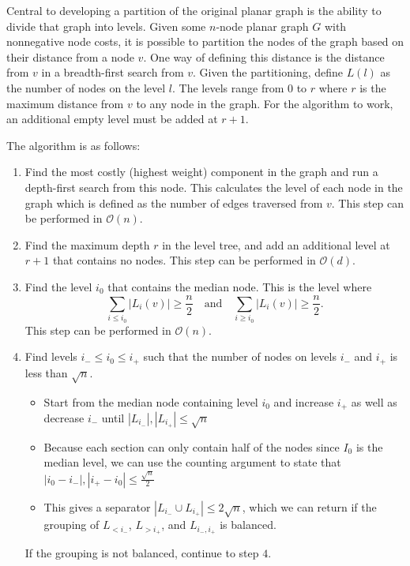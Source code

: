 \documentclass[11pt]{article}
\begin{document}
Central to developing a partition of the original planar graph is the ability to divide that graph into levels. Given some $n$-node planar graph $G$ with nonnegative node costs, it is possible to partition the nodes of the graph based on their distance from a node $v$. One way of defining this distance is the distance from $v$ in a breadth-first search from $v$. Given the partitioning, define $L(l)$ as the number of nodes on the level $l$. The levels range from $0$ to $r$ where $r$ is the maximum distance from $v$ to any node in the graph. For the algorithm to work, an additional empty level must be added at $r+1$.

The algorithm is as follows:
\begin{enumerate}

    \item Find the most costly (highest weight) component in the graph and run a depth-first search from this node. This calculates the level of each node in the graph which is defined as the number of edges traversed from $v$. This step can be performed in $\mathcal{O}(n)$.

    \item Find the maximum depth $r$ in the level tree, and add an additional level at $r+1$ that contains no nodes. This step can be performed in $\mathcal{O}(d)$.

    \item Find the level $i_0$ that contains the median node. This is the level where
    \[
    \sum_{i \leq i_0} |L_i(v)| \geq \frac{n}{2} \quad \text{and}\quad \sum_{i \geq i_0} |L_i(v)| \geq \frac{n}{2}.
    \]
    This step can be performed in $\mathcal{O}(n)$.

    \item Find levels $i_- \leq i_0 \leq i_+$ such that the number of nodes on levels $i_-$ and $i_+$ is less than $\sqrt{n}$.
    \begin{itemize}
        \item Start from the median node containing level $i_0$ and increase $i_+$ as well as decrease $i_-$ until $|L_{i_-}|,|L_{i_+}| \leq \sqrt{n}$

        \item Because each section can only contain half of the nodes since $I_0$ is the median level, we can use the counting argument to state that $|i_0 - i_-|,|i_+ - i_0| \leq \frac{\sqrt{n}}{2}$

        \item This gives a separator $|L_{i_-} \cup L_{i_+}| \leq 2 \sqrt{n}$, which we can return if the grouping of $L_{< i_-}$, $L_{> i_+}$, and $L_{i_-,i_+}$ is balanced.
    \end{itemize}
    If the grouping is not balanced, continue to step $4$.


\end{enumerate}
\end{document}
